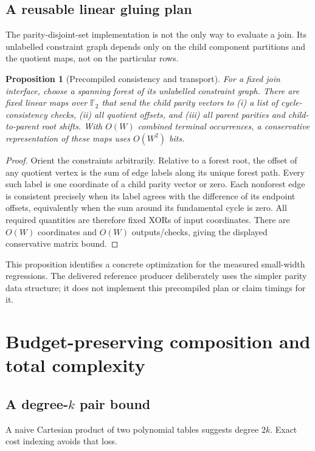 \documentclass[11pt,letterpaper]{article}
\newtheorem{proposition}[theorem]{Proposition}
\theoremstyle{definition}
\theoremstyle{remark}\newtheorem{remark}[theorem]{Remark}
\newcommand{\F}{\mathbb F}
\begin{document}
\subsection{A reusable linear gluing plan}
The parity-disjoint-set implementation is not the only way to evaluate a join. Its unlabelled constraint graph depends only on the child component partitions and the quotient maps, not on the particular rows.

\begin{proposition}[Precompiled consistency and transport]\label{prop:plan}
For a fixed join interface, choose a spanning forest of its unlabelled constraint graph. There are fixed linear maps over $\F_2$ that send the child parity vectors to (i) a list of cycle-consistency checks, (ii) all quotient offsets, and (iii) all parent parities and child-to-parent root shifts. With $O(W)$ combined terminal occurrences, a conservative representation of these maps uses $O(W^2)$ bits.
\end{proposition}
\begin{proof}
Orient the constraints arbitrarily. Relative to a forest root, the offset of any quotient vertex is the sum of edge labels along its unique forest path. Every such label is one coordinate of a child parity vector or zero. Each nonforest edge is consistent precisely when its label agrees with the difference of its endpoint offsets, equivalently when the sum around its fundamental cycle is zero. All required quantities are therefore fixed XORs of input coordinates. There are $O(W)$ coordinates and $O(W)$ outputs/checks, giving the displayed conservative matrix bound.
\end{proof}
This proposition identifies a concrete optimization for the measured small-width regressions. The delivered reference producer deliberately uses the simpler parity data structure; it does not implement this precompiled plan or claim timings for it.

\section{Budget-preserving composition and total complexity}
\label{sec:complexity}
\subsection{A degree-\texorpdfstring{$k$}{k} pair bound}
A naive Cartesian product of two polynomial tables suggests degree $2k$. Exact cost indexing avoids that loss.
\end{document}

